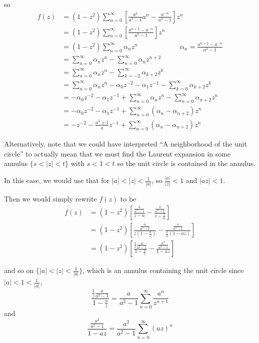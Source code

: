 \documentclass[12pt]{Qual}
\begin{document}
\begin{solution}
so \begin{align*}
    f(z)&=(1-z^2)\sum_{n=0}^\infty\left[\frac{a^2}{a^2-1}a^n-\frac{a^{-n}}{a^2-1}\right]z^n\\
    &=(1-z^2)\sum_{n=0}^\infty\left[\frac{a^{n+2}-a^{-n}}{a^2-1}\right]z^n\\
    &=(1-z^2)\sum_{n=0}^\infty \alpha_nz^n\qquad\qquad\qquad \alpha_n=\frac{a^{n+2}-a^{-n}}{a^2-1}\\
    &=\sum_{n=0}^\infty \alpha_nz^n-\sum_{n=0}^\infty \alpha_nz^{n+2}\\
    &=\sum_{n=0}^\infty \alpha_nz^n-\sum_{k=-2}^\infty \alpha_{k+2}z^k\\
    &=\sum_{n=0}^\infty \alpha_nz^n-\alpha_0z^{-2}-\alpha_1z^{-1}-\sum_{k=0}^\infty \alpha_{k+2}z^k\\
    &=-\alpha_0z^{-2}-\alpha_1z^{-1}+\sum_{n=0}^\infty \alpha_nz^n-\sum_{n=0}^\infty \alpha_{n+2}z^n\\
    &=-\alpha_0z^{-2}-\alpha_1z^{-1}+\sum_{n=0}^\infty(\alpha_n-\alpha_{n+2})z^n\\
    &=-z^{-2}-\frac{a^2+1}{a}z^{-1}+\sum_{n=0}^\infty(\alpha_n-\alpha_{n+2})z^n
\end{align*}

Alternatively, note that we could have interpreted ``A neighborhood of the unit circle'' to actually mean that we must find the Laurent expansion in some annulus $\{s<|z|<t\}$ with $s<1<t$ so the unit circle is contained in the annulus.

In this case, we would use that for $|a|<|z|<\frac{1}{|a|}$, so $\frac{|a|}{|z|}<1$ and $|az|<1$.

Then we would simply rewrite $f(z)$ to be \begin{align*}
    f(z)&=(1-z^2)\left[\frac{\frac{a}{a^2-1}}{z-a}-\frac{\frac{a}{a^2-1}}{z-\frac{1}{a}}\right]\\
    &=(1-z^2)\left[\frac{\frac{a}{a^2-1}}{z(1-\frac{a}{z})}-\frac{\frac{a}{a^2-1}}{\frac{1}{a}(1-az)}\right]\\
    &=(1-z^2)\left[\frac{\frac{1}{z}\frac{a}{a^2-1}}{1-\frac{a}{z}}-\frac{\frac{a^2}{a^2-1}}{1-az}\right]
\end{align*}

and so on $\{|a|<|z|<\frac{1}{|a|}\}$, which is an annulus containing the unit circle since $|a|<1<\frac{1}{|a|}$, $$\frac{\frac{1}{z}\frac{a}{a^2-1}}{1-\frac{a}{z}}=\frac{a}{a^2-1}\sum_{n=0}^\infty\frac{a^n}{z^{n+1}}$$ and $$\frac{\frac{a^2}{a^2-1}}{1-az}=\frac{a^2}{a^2-1}\sum_{n=0}^\infty(az)^n$$


\end{solution}
\end{document}
